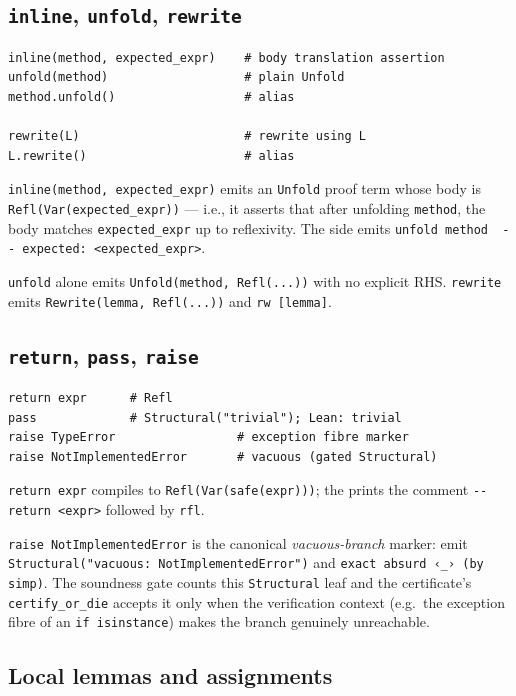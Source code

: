 \subsection{\texttt{inline}, \texttt{unfold}, \texttt{rewrite}}

\begin{lstlisting}[language=psdl]
inline(method, expected_expr)    # body translation assertion
unfold(method)                   # plain Unfold
method.unfold()                  # alias

rewrite(L)                       # rewrite using L
L.rewrite()                      # alias
\end{lstlisting}

\texttt{inline(method, expected\_expr)} emits an \texttt{Unfold}
proof term whose body is \texttt{Refl(Var(expected\_expr))} ---
i.e., it asserts that after unfolding \texttt{method}, the body
matches \texttt{expected\_expr} up to reflexivity.  The \Lean{} side
emits \verb|unfold method  -- expected: <expected_expr>|.

\texttt{unfold} alone emits \texttt{Unfold(method, Refl(...))} with
no explicit RHS.  \texttt{rewrite} emits \texttt{Rewrite(lemma,
Refl(...))} and \Lean{} \verb|rw [lemma]|.

\subsection{\texttt{return}, \texttt{pass}, \texttt{raise}}

\begin{lstlisting}[language=psdl]
return expr      # Refl
pass             # Structural("trivial"); Lean: trivial
raise TypeError                 # exception fibre marker
raise NotImplementedError       # vacuous (gated Structural)
\end{lstlisting}

\texttt{return expr} compiles to \texttt{Refl(Var(safe(expr)))}; the
\Lean{} prints the comment \verb|-- return <expr>| followed by
\verb|rfl|.

\texttt{raise NotImplementedError} is the canonical
\emph{vacuous-branch} marker: emit
\texttt{Structural("vacuous: NotImplementedError")} and \Lean{}
\verb|exact absurd ‹_› (by simp)|.  The soundness gate counts this
\texttt{Structural} leaf and the certificate's
\texttt{certify\_or\_die} accepts it only when the verification
context (e.g.\ the exception fibre of an \texttt{if isinstance})
makes the branch genuinely unreachable.

\subsection{Local lemmas and assignments}

